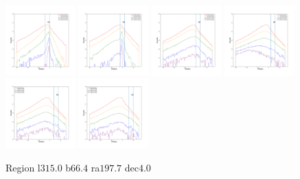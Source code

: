 \documentclass[12pt,prd]{article}
\begin{document}
\begin{figure}[h!]
\includegraphics[width=0.24\textwidth]{../figures/scanning_plotsgaiascan_l315_0_b66_4_ra197_7_dec4_0_npy_12.pdf}
\includegraphics[width=0.24\textwidth]{../figures/scanning_plotsgaiascan_l315_0_b66_4_ra197_7_dec4_0_npy_13.pdf}
\includegraphics[width=0.24\textwidth]{../figures/scanning_plotsgaiascan_l315_0_b66_4_ra197_7_dec4_0_npy_14.pdf}
\includegraphics[width=0.24\textwidth]{../figures/scanning_plotsgaiascan_l315_0_b66_4_ra197_7_dec4_0_npy_15.pdf}
\includegraphics[width=0.24\textwidth]{../figures/scanning_plotsgaiascan_l315_0_b66_4_ra197_7_dec4_0_npy_16.pdf}
\includegraphics[width=0.24\textwidth]{../figures/scanning_plotsgaiascan_l315_0_b66_4_ra197_7_dec4_0_npy_17.pdf}
\caption{Region l$315.0$ b$66.4$ ra$197.7$ dec$4.0$}
\end{figure}
\end{document}
